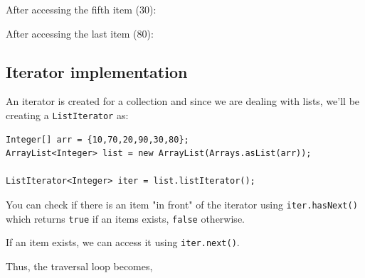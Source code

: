 \vskip 1mm

After accessing the fifth item (30):
\vskip 1mm


\vskip 1mm
				
After accessing the last item (80):
\vskip 1mm


\newpage

\subsection{Iterator implementation}

An iterator is created for a collection and since we are dealing with lists, we'll be creating a \texttt{ListIterator} as:

\begin{lstlisting}
Integer[] arr = {10,70,20,90,30,80};
ArrayList<Integer> list = new ArrayList(Arrays.asList(arr));

ListIterator<Integer> iter = list.listIterator();
\end{lstlisting}

You can check if there is an item "in front" of the iterator using \texttt{iter.hasNext()} which returns \texttt{true} if an items exists, \texttt{false} otherwise.

If an item exists, we can access it using \texttt{iter.next()}.

Thus, the traversal loop becomes,

